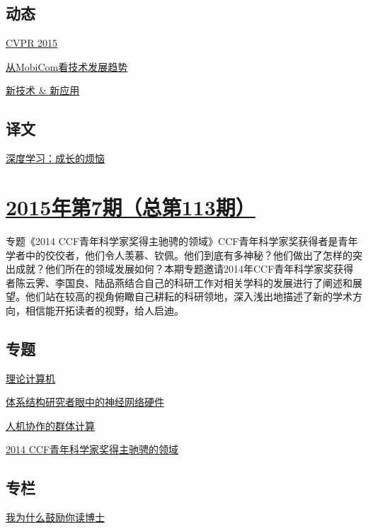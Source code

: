 \documentclass[a4paper]{article}
\begin{document}
\subsection{动态}
\href{http://history.ccf.org.cn/resources/1190201776262/2015/08/12/12.pdf}{CVPR 2015}

\href{http://history.ccf.org.cn/resources/1190201776262/2015/08/12/13.pdf}{从MobiCom看技术发展趋势}

\href{http://history.ccf.org.cn/resources/1190201776262/2015/08/12/14.pdf}{新技术 \& 新应用}

\subsection{译文}
\href{http://history.ccf.org.cn/resources/1190201776262/2015/08/12/15.pdf}{深度学习：成长的烦恼}


\section{\href{http://history.ccf.org.cn/sites/ccf/jsjtbbd.jsp?contentId=2872975896179}{\textbf{2015年第7期（总第113期）}}}
专题《2014 CCF青年科学家奖得主驰骋的领域》CCF青年科学家奖获得者是青年学者中的佼佼者，他们令人羡慕、钦佩。他们到底有多神秘？他们做出了怎样的突出成就？他们所在的领域发展如何？本期专题邀请2014年CCF青年科学家奖获得者陈云霁、李国良、陆品燕结合自己的科研工作对相关学科的发展进行了阐述和展望。他们站在较高的视角俯瞰自己耕耘的科研领地，深入浅出地描述了新的学术方向，相信能开拓读者的视野，给人启迪。
\subsection{专题}
\href{http://history.ccf.org.cn/resources/1190201776262/2015/07/13/4.pdf}{理论计算机}

\href{http://history.ccf.org.cn/resources/1190201776262/2015/07/13/2.pdf}{体系结构研究者眼中的神经网络硬件}

\href{http://history.ccf.org.cn/resources/1190201776262/2015/07/13/3.pdf}{人机协作的群体计算}

\href{http://history.ccf.org.cn/resources/1190201776262/2015/07/13/1.pdf}{2014 CCF青年科学家奖得主驰骋的领域}

\subsection{专栏}
\href{http://history.ccf.org.cn/resources/1190201776262/2015/07/13/8.pdf}{我为什么鼓励你读博士}
\end{document}
